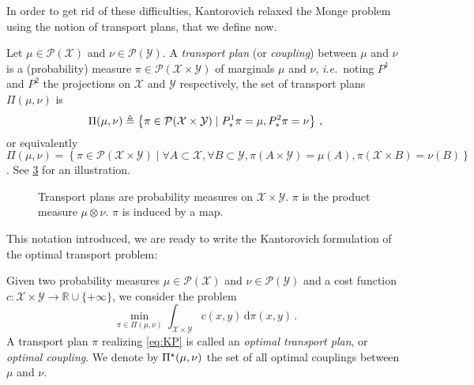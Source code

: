         In order to get rid of these difficulties, Kantorovich relaxed the Monge problem \cite{kantorovich1942translocation} using the notion of transport plans, that we define now.
        \begin{defi}
            Let $\mu \in\mathcal{P}(\mathcal{X})$ and $\nu \in\mathcal{P}(\mathcal{Y})$. A \emph{transport plan} (or \emph{coupling}) between $\mu$ and $\nu$ is a (probability) measure $\pi \in\mathcal{P}(\mathcal{X}\times \mathcal{Y})$ of marginals $\mu$ and $\nu$, \textit{i.e.}~noting $P^1$ and $P^{2}$ the projections on $\mathcal{X}$ and $\mathcal{Y}$ respectively, the set of transport plans $\Pi(\mu,\nu)$ is
            \begin{equation}
                \Pi(\mu,\nu)\triangleq\left\{ \pi \in \mathcal{P}(\mathcal{X}\times \mathcal{Y})\mid P^1_*\pi=\mu,P^{2}_*\pi=\nu \right\}\,,
                \label{eq:plans}
            \end{equation}
            or equivalently $\Pi(\mu,\nu)=\left\{ \pi \in \mathcal{P}(\mathcal{X}\times \mathcal{Y})\mid \forall A\subset \mathcal{X},\forall B\subset \mathcal{Y}, \pi(A\times \mathcal{Y})=\mu(A),\pi(\mathcal{X}\times B)=\nu(B) \right\}$. See \cref{fig:transport-plan-map} for an illustration.
            \label{def:transport-plan}
        \end{defi}
        \begin{figure}[H]
            \centering
            \begin{subfigure}[b]{.49\linewidth}
                \centering
                
                \label{fig:transport-plan}
            \end{subfigure}
            \begin{subfigure}[b]{.49\linewidth}
                \centering
                
                \label{fig:transport-map}
            \end{subfigure}
            \caption{Transport plans are probability measures on $\mathcal{X}\times \mathcal{Y}$. \capleft $\pi$ is the product measure $\mu\otimes\nu$. \capright $\pi$ is induced by a map.}
            \label{fig:transport-plan-map}
        \end{figure}
        This notation introduced, we are ready to write the Kantorovich formulation of the optimal transport problem:
        \begin{defi}
            Given two probability measures $\mu \in\mathcal{P}(\mathcal{X})$ and $\nu \in\mathcal{P}(\mathcal{Y})$ and a cost function $c:\mathcal{X}\times \mathcal{Y}\to \mathbb{R}\cup \{ +\infty \}$, we consider the problem
            \begin{equation}
                \tag{KP}
                \min_{\pi \in \Pi(\mu,\nu)} \int _{\mathcal{X}\times \mathcal{Y}}c(x,y)\, \mathrm d\pi(x,y) \,.
                \label{eq:KP}
            \end{equation}
            A transport plan $\pi$ realizing \cref{eq:KP} is called an \emph{optimal transport plan}, or \emph{optimal coupling}. We denote by $\Pi^\star(\mu,\nu)$ the set of all optimal couplings between $\mu$ and $\nu$.
        \end{defi}
